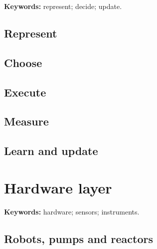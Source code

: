 \begin{insightbox}
\textbf{Keywords:} represent; decide; update.
\end{insightbox}

\subsection{Represent}


\subsection{Choose}


\subsection{Execute}


\subsection{Measure}


\subsection{Learn and update}


\section{Hardware layer}

\begin{methodbox}
\textbf{Keywords:} hardware; sensors; instruments.
\end{methodbox}

\subsection{Robots, pumps and reactors}


